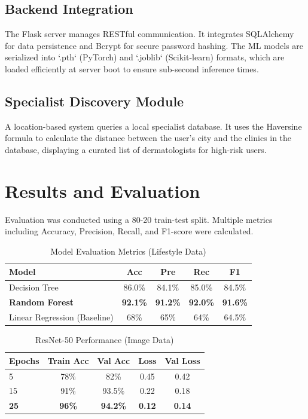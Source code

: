 \documentclass[conference]{IEEEtran}
\begin{document}
\subsection{Backend Integration}
The Flask server manages RESTful communication. It integrates SQLAlchemy for data persistence and Bcrypt for secure password hashing. The ML models are serialized into `.pth` (PyTorch) and `.joblib` (Scikit-learn) formats, which are loaded efficiently at server boot to ensure sub-second inference times.

\subsection{Specialist Discovery Module}
A location-based system queries a local specialist database. It uses the Haversine formula to calculate the distance between the user's city and the clinics in the database, displaying a curated list of dermatologists for high-risk users.

\section{Results and Evaluation}
Evaluation was conducted using a 80-20 train-test split. Multiple metrics including Accuracy, Precision, Recall, and F1-score were calculated.

\begin{table}[H]
\centering
\caption{Model Evaluation Metrics (Lifestyle Data)}
\label{tab:lifestyle_results}
\begin{tabular}{|l|c|c|c|c|}
\hline
\textbf{Model} & \textbf{Acc} & \textbf{Pre} & \textbf{Rec} & \textbf{F1} \\ \hline
Decision Tree & 86.0\% & 84.1\% & 85.0\% & 84.5\% \\ \hline
\textbf{Random Forest} & \textbf{92.1\%} & \textbf{91.2\%} & \textbf{92.0\%} & \textbf{91.6\%} \\ \hline
Linear Regression (Baseline) & 68\% & 65\% & 64\% & 64.5\% \\ \hline
\end{tabular}
\end{table}

\begin{table}[H]
\centering
\caption{ResNet-50 Performance (Image Data)}
\label{tab:image_results}
\begin{tabular}{|l|c|c|c|c|}
\hline
\textbf{Epochs} & \textbf{Train Acc} & \textbf{Val Acc} & \textbf{Loss} & \textbf{Val Loss} \\ \hline
5 & 78\% & 82\% & 0.45 & 0.42 \\ \hline
15 & 91\% & 93.5\% & 0.22 & 0.18 \\ \hline
\textbf{25} & \textbf{96\%} & \textbf{94.2\%} & \textbf{0.12} & \textbf{0.14} \\ \hline
\end{tabular}
\end{table}
\end{document}
